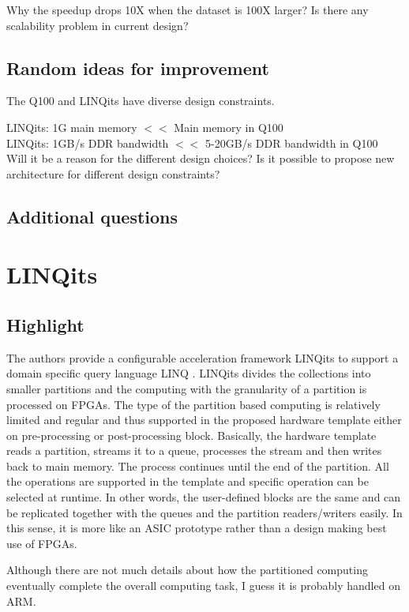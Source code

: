 Why the speedup drops 10X when the dataset is 100X larger? 
Is there any scalability problem in current design?

\subsection{Random ideas for improvement}
The Q100 and LINQits have diverse design constraints. 

LINQits: 1G main memory $<<$ Main memory in Q100 \\
LINQits: 1GB/s DDR bandwidth $<<$ 5-20GB/s DDR bandwidth in Q100 \\

Will it be a reason for the different design
choices? Is it possible to propose new architecture for different design constraints?

\subsection{Additional questions}

\section{LINQits}
\subsection{Highlight}
The authors provide a configurable acceleration framework LINQits to support a domain specific query
language LINQ \cite{chung2013linqits}. LINQits divides the collections into smaller
partitions and the computing with the granularity of a partition is processed on FPGAs. 
The type of the partition based computing is relatively limited
and regular and thus supported in the proposed hardware template either on pre-processing or
post-processing block. Basically, the hardware template reads a partition, streams it to a queue,  
processes the stream and then writes back to main memory. The process continues until the end of the
partition. All the operations are supported in the template and specific operation can be selected
at runtime. In other words, the user-defined blocks are the same and can be replicated together with
the queues and the partition readers/writers easily. In this sense, it is more like an ASIC
prototype rather than a design making best use of FPGAs.

Although there are not much details about how the partitioned computing
eventually complete the overall computing task, I guess it is probably handled on ARM.

